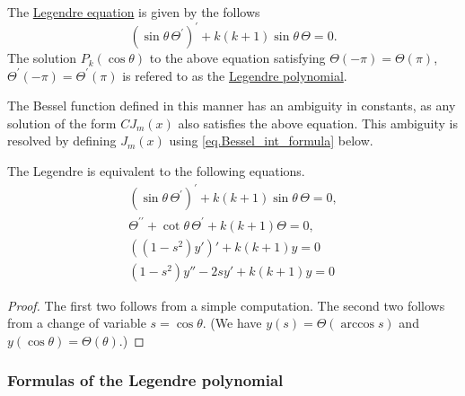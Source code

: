 \begin{definition} The \underline{Legendre equation} is given by the follows
\begin{equation}\label{eq.Legendre_equation}
    (\sin\theta\,\Theta^{\prime})^{\prime}+k(k+1) \sin\theta\,\Theta=0.
\end{equation}
The solution $P_k(\cos\theta)$ to the above equation satisfying $\Theta(-\pi)=\Theta(\pi)$, $\Theta^{\prime}(-\pi)=\Theta^{\prime}(\pi)$ is refered to as the \underline{Legendre polynomial}. 
\end{definition}
\begin{remark}[]
    The Bessel function defined in this manner has an ambiguity in constants, as any solution of the form $C J_m(x)$ also satisfies the above equation. This ambiguity is resolved by defining $J_m(x)$ using \eqref{eq.Bessel_int_formula} below.
\end{remark}

\begin{lemma}[]
The Legendre is equivalent to the following equations.
\begin{equation}\label{eq.Legendre_equiv}
\begin{gathered}
    (\sin\theta\,\Theta^{\prime})^{\prime}+k(k+1) \sin\theta\,\Theta=0,
    \\
    \Theta^{\prime\prime} + \cot\theta\,\Theta^{\prime}+k(k+1) \Theta=0,
    \\
    ((1-s^2)y')' + k(k+1) y = 0
    \\
    (1-s^2)y'' - 2sy' + k(k+1) y = 0
\end{gathered}
\end{equation}
\end{lemma}
\begin{proof}
    The first two follows from a simple computation. The second two follows from a change of variable $s = \cos \theta$. (We have $y(s) = \Theta(\arccos s)$ and $y(\cos \theta) = \Theta(\theta)$.)
\end{proof}

\subsubsection{Formulas of the Legendre polynomial}

